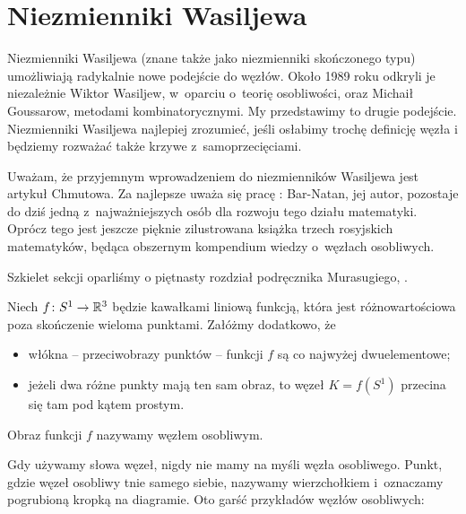 \section{Niezmienniki Wasiljewa}
\label{sec:vassiliev}
Niezmienniki Wasiljewa (znane także jako niezmienniki skończonego typu) umożliwiają radykalnie nowe podejście do węzłów.
Około 1989 roku odkryli je niezależnie Wiktor Wasiljew, w~oparciu o~teorię osobliwości, oraz Michaił Goussarow, metodami kombinatorycznymi.
My przedstawimy to drugie podejście.
Niezmienniki Wasiljewa najlepiej zrozumieć, jeśli osłabimy trochę definicję węzła i będziemy rozważać także krzywe z~samoprzecięciami.

Uważam, że przyjemnym wprowadzeniem do niezmienników Wasiljewa jest artykuł \cite{chmutov12} Chmutowa.
Za najlepsze uważa się pracę \cite{barnatan_95}: Bar-Natan, jej autor, pozostaje do dziś jedną z~najważniejszych osób dla rozwoju tego działu matematyki.
Oprócz tego jest jeszcze pięknie zilustrowana książka \cite{duzhin12} trzech rosyjskich matematyków, będąca obszernym kompendium wiedzy o~węzłach osobliwych.

Szkielet sekcji oparliśmy o piętnasty rozdział podręcznika Murasugiego, \cite{murasugi96}.

\begin{definition}
%
    Niech $f \colon S^1 \to \mathbb R^3$ będzie kawałkami liniową funkcją, która jest różnowartościowa poza skończenie wieloma punktami.
    Załóżmy dodatkowo, że
    \begin{itemize}
        \item włókna -- przeciwobrazy punktów -- funkcji $f$ są co najwyżej dwuelementowe;
        \item jeżeli dwa różne punkty mają ten sam obraz, to węzeł $K = f(S^1)$ przecina się tam pod kątem prostym.
    \end{itemize}
    Obraz funkcji $f$ nazywamy węzłem osobliwym.
\end{definition}

Gdy używamy słowa węzeł, nigdy nie mamy na myśli węzła osobliwego.
Punkt, gdzie węzeł osobliwy tnie samego siebie, nazywamy wierzchołkiem i~oznaczamy pogrubioną kropką na diagramie.
%
Oto garść przykładów węzłów osobliwych:

